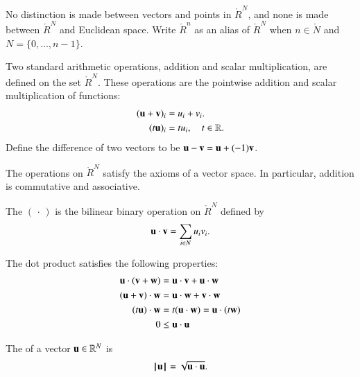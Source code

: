 No distinction is made between vectors and points in $\ring{R}^N$, and
none is made between $\ring{R}^N$ and Euclidean space.  Write
$\ring{R}^n$ as an alias of $\ring{R}^N$ when $n\in\ring{N}$ and
$N=\{0,\ldots,n-1\}$.  

\begin{definition} %
  Two standard arithmetic operations, addition and scalar
  multiplication, are defined on the set $\ring{R}^N$.  These
  operations are the pointwise addition and scalar multiplication of
  functions:
\begin{align}
({\mathbf u} + {\mathbf v})_i &= u_i + v_i.\nonumber\\
(t {\mathbf u})_i &= t u_i,\quad t\in\mathbb{R}.
\end{align}
%
%
Define the difference of two vectors to be ${\mathbf u} - {\mathbf v} = {\mathbf u} + (-1) {\mathbf v}$.
%
\end{definition}
The operations on $\ring{R}^N$ 
satisfy the axioms of a vector space. 
In particular, addition is commutative and associative.


\begin{definition}
\label{def:dot}
The   $(\,\cdot\,)$ is the
 bilinear binary operation on $\ring{R}^N$
defined by
\[ 
{\mathbf u}\cdot {\mathbf v} = \sum_{i\in N} u_i v_i.
\] 
%
%
\end{definition}


The dot product satisfies the following
properties:
\begin{align}\label{eqn:dot}
{\mathbf u} \cdot ({\mathbf v} + {\mathbf w}) &= {\mathbf u} \cdot {\mathbf v} + {\mathbf u} \cdot {\mathbf w}\nonumber\\
({\mathbf u} + {\mathbf v})\cdot {\mathbf w} &= {\mathbf u} \cdot {\mathbf w} + {\mathbf v} \cdot {\mathbf w}\nonumber\\
(t {\mathbf u})\cdot {\mathbf w} &= t({\mathbf u} \cdot {\mathbf w}) = {\mathbf u} \cdot (t {\mathbf w})\\
0 &\le {\mathbf u}\cdot {\mathbf u}\nonumber
\end{align}


\begin{definition}[norm]
\label{def:norm}
The  of a vector ${\mathbf u}\in\mathbb{R}^N$ is
\[ {{\hskip0.1em|\hskip-0.15em|\hskip0.1em}{\mathbf u}{\hskip0.1em|\hskip-0.15em|\hskip0.1em}} = \sqrt{{\mathbf u}\cdot {\mathbf u}}.\] 
%
\end{definition}


